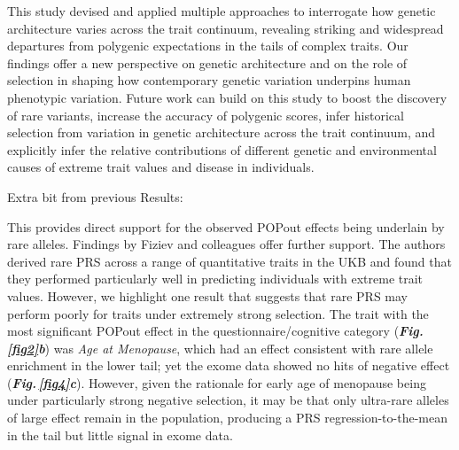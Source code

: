 \documentclass[12pt]{zHenriquesLab-StyleBioRxiv}
\newcommand\dref[2]{\normalsize{\textbf{\textit{Fig.\,\ref{#1}#2}}}\normalsize{}}
\begin{document}
{{This study devised and applied multiple approaches to interrogate how genetic architecture 
varies across the trait continuum, revealing striking and widespread departures from polygenic 
expectations in the tails of complex traits. Our findings offer a new perspective on 
genetic architecture and on the role of selection in shaping how contemporary genetic 
variation underpins human phenotypic variation. Future work can build on this study to boost 
the discovery of rare variants, increase the accuracy of polygenic scores, infer historical 
selection from variation in genetic architecture across the trait continuum, 
and explicitly infer the relative contributions of different genetic and environmental 
causes of extreme trait values and disease in individuals.

Extra bit from previous Results:

This provides direct 
support for the observed POPout effects 
being underlain by rare alleles. Findings by Fiziev and 
colleagues \cite{Fiziev2023} offer further support. 
The authors derived rare PRS across a range of quantitative 
traits in the UKB and found that they performed particularly well in 
predicting individuals with extreme trait values. 
However, we highlight one result that suggests that rare 
PRS may perform poorly for traits under extremely strong 
selection. The trait with the most significant POPout 
effect in the questionnaire/cognitive category 
(\dref{fig2}{b}) was \textit{Age at Menopause}, 
which had an effect consistent with rare allele 
enrichment in the lower tail; yet the exome data showed 
no hits of negative effect (\dref{fig4}{c}). However, 
given the rationale for early age of menopause being 
under particularly strong negative selection, it may 
be that only ultra-rare alleles of large effect 
remain in the population, producing a PRS regression-to-the-mean 
in the tail but little signal in exome data.

%
%
%
%
%
%
%
%
%
%
%
%
%
%
%
%
%
%
%
%
%
%
%
%
%
%
%
%
%
%
%
%
%
%
%
%
%
%
%
%
%
%
%
%
}}
\end{document}
